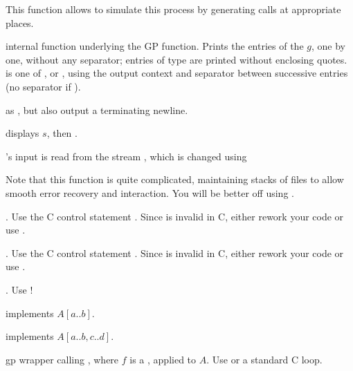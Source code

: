 This  function allows  to simulate this process by
generating  calls at appropriate places.


internal function underlying the
 GP function. Prints the entries of the  $g$, one by one,
without any separator; entries of type  are printed without enclosing
quotes. \fl is one of ,  or , using the
output context  and separator  between
successive entries (no separator if ).

 as
, but also output a terminating newline.

 displays $s$,
then .


's input is read from the stream , which is changed
using


Note that this function is quite complicated, maintaining stacks of files
to allow smooth error recovery and  interaction. You will be better
off using .


. Use the C control statement . Since
 is invalid in C, either rework your code or use .

. Use the C control statement . Since
 is invalid in C, either rework your code or use .

. Use !


 implements $A[a..b]$.

implements $A[a..b, c..d]$.


 gp wrapper calling , where $f$
is a , applied to $A$. Use  or a standard C loop.

